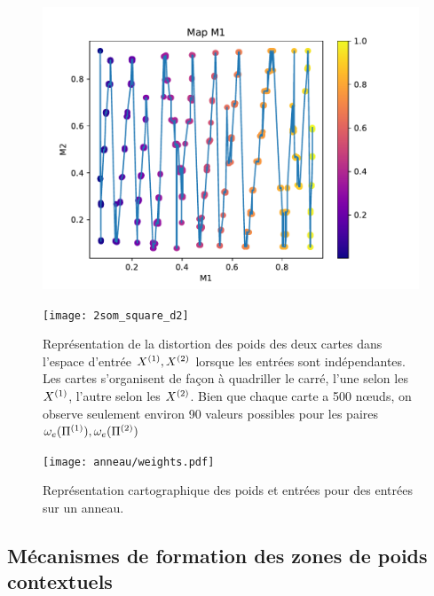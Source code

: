 \documentclass[../main]{subfiles}
\begin{document}
\begin{figure}
	\begin{minipage}{0.48\textwidth}
		\includegraphics[width=\textwidth]{2som_square_d}
	\end{minipage}
	\begin{minipage}{0.48\textwidth}
		\texttt{[image: 2som\_square\_d2]}
	\end{minipage}
	\caption{Représentation de la distortion des poids des deux cartes dans l'espace d'entrée $X^{({1})}, X^{({2})}$ lorsque les entrées sont indépendantes. Les cartes s'organisent de façon à quadriller le carré, l'une selon les $X^{({1})}$, l'autre selon les $X^{({2})}$. Bien que chaque carte a 500 n\oe{}uds, on observe seulement environ 90 valeurs possibles pour les paires $\omega_e(\Pi^{({1})}),\omega_e(\Pi^{({2})})$ \label{fig:2som_p_d}}
\end{figure}


\begin{figure}
	\centering\texttt{[image: anneau/weights.pdf]}
	\caption{Représentation cartographique des poids et entrées pour des entrées sur un anneau. \label{fig:anneau_w}}
\end{figure}

\subsection{Mécanismes de formation des zones de poids contextuels}
\end{document}
